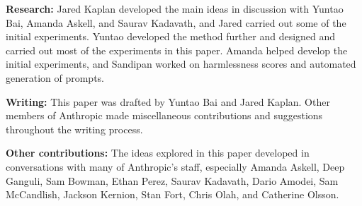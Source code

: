 {\bf Research:} Jared Kaplan  developed the main ideas in discussion with Yuntao Bai, Amanda Askell, and Saurav Kadavath, and Jared carried out some of the initial experiments. Yuntao  developed the method further and designed and carried out most of the experiments in this paper. Amanda  helped develop the initial experiments, and Sandipan  worked on harmlessness scores and automated generation of prompts.

{\bf Writing:} This paper was drafted by Yuntao Bai and Jared Kaplan. Other members of Anthropic made miscellaneous contributions and suggestions throughout the writing process.

{\bf Other contributions:} The ideas explored in this paper developed in conversations with many of Anthropic's staff, especially Amanda Askell, Deep Ganguli, Sam Bowman, Ethan Perez, Saurav Kadavath, Dario Amodei, Sam McCandlish, Jackson Kernion, Stan Fort, Chris Olah, and Catherine Olsson.


